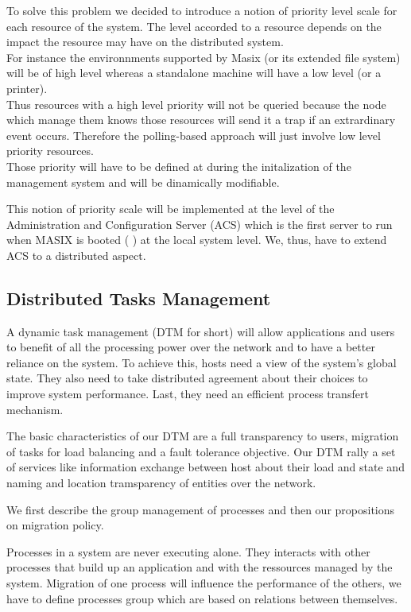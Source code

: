    To solve this problem we decided to introduce a notion of priority level scale for each resource of the system. The level accorded to a resource depends on the impact the resource may have on the distributed system.\\
   For instance the environnments supported by Masix (or its extended file system) will be of high level whereas a standalone machine will have a low level (or a printer).\\
   Thus resources with a high level priority will not be queried because the node which manage them knows those resources will send it a trap if an extrardinary event occurs. Therefore the polling-based approach will just involve low level priority resources.\\
   Those priority will have to be defined at during the initalization of the management system and will be dinamically modifiable.

   This notion of priority scale will be implemented at the level of the Administration and Configuration Server (ACS) which is the first server to run when MASIX is booted ( \cite {masix:osf}) at the local system level. We, thus, have to extend ACS to a distributed aspect. 
 


\subsection {Distributed Tasks Management}

%

A dynamic task management (DTM for short) will allow applications and users to benefit of all the 
processing power over the network and to have a better reliance on the system. 
To achieve this, hosts need a view of the system's global state.
They also need to take distributed agreement about their choices to improve system performance. 
Last, they need an efficient process transfert mechanism.

The basic characteristics of our DTM are a full transparency to users, migration of tasks for 
load balancing and a fault tolerance objective. 
Our DTM rally a set of services like information exchange between host about their load and state and
naming and location tramsparency of entities over the network.

We first describe the group management of processes and then our propositions on migration policy. 


Processes in a system are never executing alone. 
They interacts with other processes that build up an application and with the ressources managed by the system. 
Migration of one process will influence the performance of the others, we have to define processes group 
which are based on relations between themselves. 

